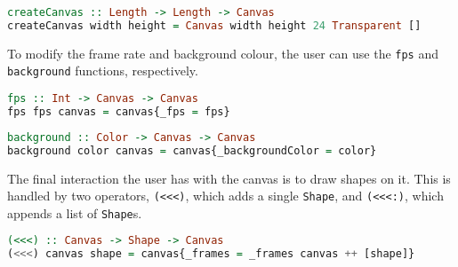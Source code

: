\documentclass[../main.tex]{subfiles}
\begin{document}
            \begin{minipage}{\linewidth}
                \begin{lstlisting}[language=Haskell, label={lst:createCanvas}, caption={The createCanvas function.
                Default values are provided for the frame rate, background colour and frames.}]
createCanvas :: Length -> Length -> Canvas
createCanvas width height = Canvas width height 24 Transparent []
                \end{lstlisting}
            \end{minipage}

            To modify the frame rate and background colour, the user can use the \verb|fps|
                and \verb|background| functions, respectively.

            \begin{minipage}{\linewidth}
                \begin{lstlisting}[language=Haskell, label={lst:fps}, caption={The fps function.}]
fps :: Int -> Canvas -> Canvas
fps fps canvas = canvas{_fps = fps}
                \end{lstlisting}
            \end{minipage}

            \begin{minipage}{\linewidth}
                \begin{lstlisting}[language=Haskell, label={lst:background}, caption={The background function.}]
background :: Color -> Canvas -> Canvas
background color canvas = canvas{_backgroundColor = color}
                \end{lstlisting}
            \end{minipage}

            The final interaction the user has with the canvas is to draw shapes on it.
            This is handled by two operators, \verb|(<<<)|, which adds a single
                \verb|Shape|, and \verb|(<<<:)|, which appends a list of \verb|Shape|s.

            \begin{minipage}{\linewidth}
                \begin{lstlisting}[language=Haskell, label={lst:<<<}, caption={The operator to append a single
                    frame to the canvas.}]
(<<<) :: Canvas -> Shape -> Canvas
(<<<) canvas shape = canvas{_frames = _frames canvas ++ [shape]}
                \end{lstlisting}
            \end{minipage}
\end{document}
